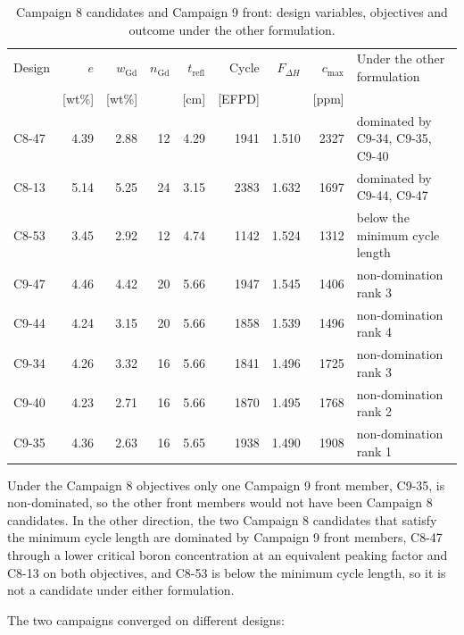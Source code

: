 \begin{table}[!htb]
  \centering
  \caption{Campaign 8 candidates and Campaign 9 front: design variables, objectives and outcome under the other formulation.}
  \label{tab:c8-c9-compare}
  \footnotesize
  \setlength{\tabcolsep}{4pt}
  \begin{tabular}{@{}lrrrrrrrl@{}}
    \toprule
    Design & $e$ & $w_\mathrm{Gd}$ & $n_\mathrm{Gd}$ & $t_\mathrm{refl}$ & Cycle & $F_{\Delta H}$ & $c_\mathrm{max}$ & Under the other formulation \\
           & [wt\%] & [wt\%] & & [cm] & [EFPD] & & [ppm] & \\
    \midrule
    C8-47 & 4.39 & 2.88 & 12 & 4.29 & 1941 & 1.510 & 2327 & dominated by C9-34, C9-35, C9-40 \\
    C8-13 & 5.14 & 5.25 & 24 & 3.15 & 2383 & 1.632 & 1697 & dominated by C9-44, C9-47 \\
    C8-53 & 3.45 & 2.92 & 12 & 4.74 & 1142 & 1.524 & 1312 & below the minimum cycle length \\
    \midrule
    C9-47 & 4.46 & 4.42 & 20 & 5.66 & 1947 & 1.545 & 1406 & non-domination rank 3 \\
    C9-44 & 4.24 & 3.15 & 20 & 5.66 & 1858 & 1.539 & 1496 & non-domination rank 4 \\
    C9-34 & 4.26 & 3.32 & 16 & 5.66 & 1841 & 1.496 & 1725 & non-domination rank 3 \\
    C9-40 & 4.23 & 2.71 & 16 & 5.66 & 1870 & 1.495 & 1768 & non-domination rank 2 \\
    C9-35 & 4.36 & 2.63 & 16 & 5.65 & 1938 & 1.490 & 1908 & non-domination rank 1 \\
    \bottomrule
  \end{tabular}
\end{table}

Under the Campaign 8 objectives only one Campaign 9 front member,
C9-35, is non-dominated, so the other front members would not have
been Campaign 8 candidates. In the other direction, the two Campaign 8
candidates that satisfy the minimum cycle length are dominated by
Campaign 9 front members, C8-47 through a lower critical boron
concentration at an equivalent peaking factor and C8-13 on both
objectives, and C8-53 is below the minimum cycle length, so it is not a
candidate under either formulation.

The two campaigns converged on different designs:

